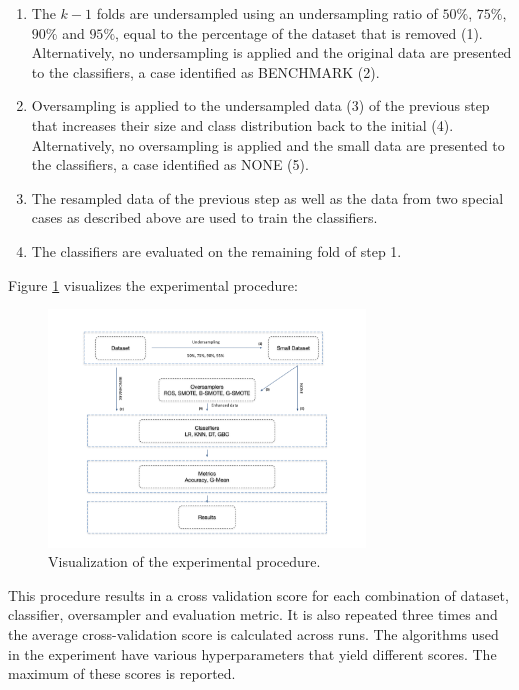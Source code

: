 \begin{enumerate}

	\item The \( k - 1 \) folds are undersampled using an undersampling ratio
	of $50\%$, $75\%$, $90\%$ and $95\%$, equal to the percentage of the dataset that is removed (1). Alternatively, no undersampling is applied and the original data are presented to the classifiers, a case identified as BENCHMARK (2).

	\item Oversampling is applied to the undersampled data (3) of the previous
	step that increases their size and class distribution back to the initial (4). Alternatively, no oversampling is applied and the small data are presented to the classifiers, a case identified as NONE (5).

	\item The resampled data of the previous step as well as the data from two special cases as described above are used to train the classifiers.
	
	\item The classifiers are evaluated on the remaining fold of step 1.

\end{enumerate}

 Figure \ref{fig:experimentalprocedure} visualizes the experimental procedure: 

\begin{figure}
	\centering
	\includegraphics[width=0.75\textwidth]{../analysis/experimental_procedure.png}
	\caption{Visualization of the experimental procedure.}
	\label{fig:experimentalprocedure}
\end{figure}

This procedure results in a cross validation score for each combination of dataset, classifier, oversampler and evaluation metric. It is also repeated three times and the average cross-validation score is calculated across runs. The algorithms used in the experiment have various hyperparameters that yield different scores. The maximum of these scores is reported.


